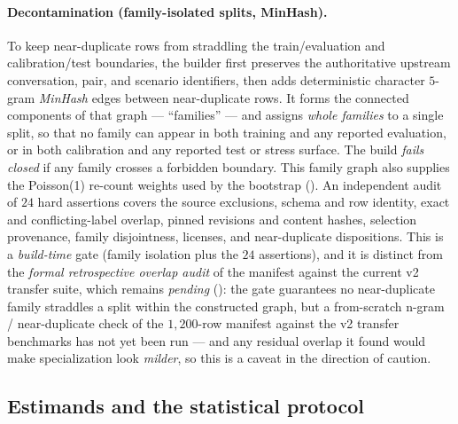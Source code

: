 \paragraph{Decontamination (family-isolated splits, MinHash).} To keep near-duplicate rows from
straddling the train/evaluation and calibration/test boundaries, the builder first preserves the
authoritative upstream conversation, pair, and scenario identifiers, then adds deterministic character
$5$-gram \emph{MinHash} edges between near-duplicate rows. It forms the connected components of that
graph --- ``families'' --- and assigns \emph{whole families} to a single split, so that no family can
appear in both training and any reported evaluation, or in both calibration and any reported test or
stress surface. The build \emph{fails closed} if any family crosses a forbidden boundary. This family
graph also supplies the Poisson(1) re-count weights used by the bootstrap (). An
independent audit of $24$ hard assertions covers the source exclusions, schema and row identity,
exact and conflicting-label overlap, pinned revisions and content hashes, selection provenance, family
disjointness, licenses, and near-duplicate dispositions. This is a \emph{build-time} gate (family isolation
plus the $24$ assertions), and it is distinct from the \emph{formal retrospective overlap audit} of the
manifest against the current v2 transfer suite, which remains \emph{pending} (): the
gate guarantees no near-duplicate family straddles a split within the constructed graph, but a from-scratch
n-gram / near-duplicate check of the $1{,}200$-row manifest against the v2 transfer benchmarks has not yet
been run --- and any residual overlap it found would make specialization look \emph{milder}, so this is a
caveat in the direction of caution.

\subsection{Estimands and the statistical protocol}
\label{sec:setup-stats}

